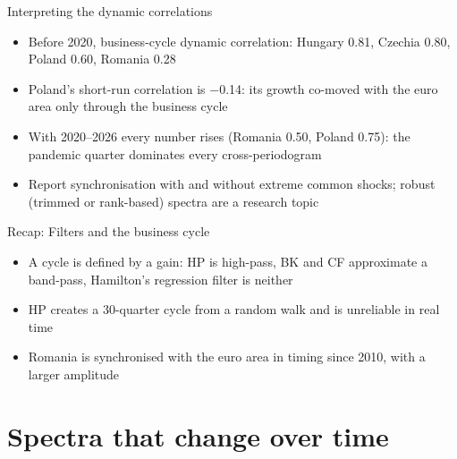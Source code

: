 \begin{frame}{Interpreting the dynamic correlations}
\itemsize{\small}
\begin{itemize}
    \item Before 2020, business-cycle dynamic correlation: Hungary 0.81, Czechia 0.80, Poland 0.60, Romania 0.28
    \item Poland's short-run correlation is \ensuremath{-}0.14: its growth co-moved with the euro area only through the business cycle
    \item With 2020--2026 every number rises (Romania 0.50, Poland 0.75): the pandemic quarter dominates every cross-periodogram
    \item Report synchronisation with and without extreme common shocks; robust (trimmed or rank-based) spectra are a research topic
\end{itemize}
\end{frame}

\begin{frame}{Recap: Filters and the business cycle}
\itemsize{\small}
\begin{itemize}
    \item A cycle is defined by a gain: HP is high-pass, BK and CF approximate a band-pass, Hamilton's regression filter is neither
    \item HP creates a 30-quarter cycle from a random walk and is unreliable in real time
    \item Romania is synchronised with the euro area in timing since 2010, with a larger amplitude
\end{itemize}
\end{frame}


\section{Spectra that change over time}

